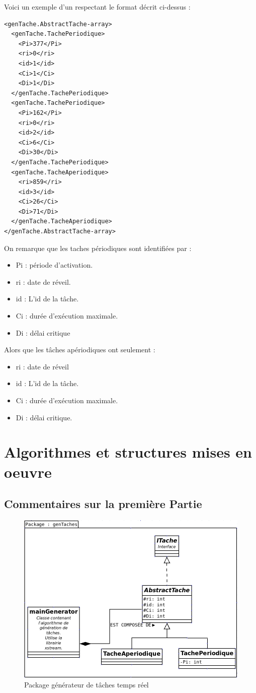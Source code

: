 Voici un exemple d'un respectant le format décrit ci-dessus : 

\begin{lstlisting}
<genTache.AbstractTache-array>
  <genTache.TachePeriodique>
    <Pi>377</Pi>
    <ri>0</ri>
    <id>1</id>
    <Ci>1</Ci>
    <Di>1</Di>
  </genTache.TachePeriodique>
  <genTache.TachePeriodique>
    <Pi>162</Pi>
    <ri>0</ri>
    <id>2</id>
    <Ci>6</Ci>
    <Di>30</Di>
  </genTache.TachePeriodique>
  <genTache.TacheAperiodique>
    <ri>859</ri>
    <id>3</id>
    <Ci>26</Ci>
    <Di>71</Di>
  </genTache.TacheAperiodique>
</genTache.AbstractTache-array>
\end{lstlisting}
On remarque que les taches périodiques sont identifiées par : 
\begin{itemize}
\item
Pi : période d'activation.
\item
ri : date de réveil.
\item
id : L'id de la tâche.
\item
Ci : durée d'exécution maximale.
\item
Di  : délai critique
\end{itemize} 
Alors que les tâches apériodiques ont seulement : 
\begin{itemize}
\item
ri  : date de réveil
\item
id : L'id de la tâche.
\item
Ci : durée d'exécution maximale.
\item
Di : délai critique.
\end{itemize} 


\section{Algorithmes et structures mises en oeuvre}

\subsection{Commentaires sur la première Partie}
   \begin{figure}[htbp]
  \centering
  \includegraphics[scale=0.60]{img/packgen}
  \caption{Package générateur de tâches temps réel}
  \label{fig:gen}
\end{figure}

